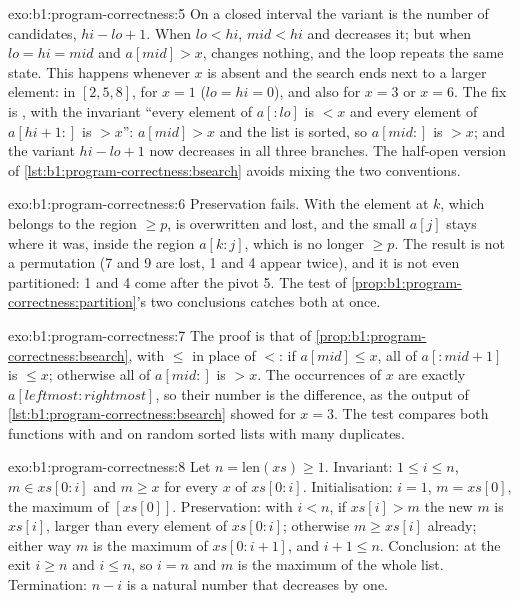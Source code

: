 \begin{solution}{exo:b1:program-correctness:5}
On a closed interval the variant is the number of candidates, $hi - lo + 1$. When $lo < hi$, $mid < hi$ and
 decreases it; but when $lo = hi = mid$ and $a[mid] > x$,  changes nothing, and the loop
repeats the same state. This happens whenever $x$ is absent and the search ends next to a larger element: in
$[2, 5, 8]$, for $x = 1$ ($lo = hi = 0$), and also for $x = 3$ or $x = 6$. The fix is , with the
invariant ``every element of $a[{:}lo]$ is $< x$ and every element of $a[hi + 1{:}]$ is $> x$'': $a[mid] > x$ and the
list is sorted, so $a[mid{:}]$ is $> x$; and the variant $hi - lo + 1$ now decreases in all three branches. The
half-open version of \cref{lst:b1:program-correctness:bsearch} avoids mixing the two conventions.
\end{solution}

\begin{solution}{exo:b1:program-correctness:6}
Preservation fails. With  the element at $k$, which belongs to the region $\geq p$, is overwritten and
lost, and the small $a[j]$ stays where it was, inside the region $a[k{:}j]$, which is no longer $\geq p$. The result is
not a permutation (7 and 9 are lost, 1 and 4 appear twice), and it is not even partitioned: 1 and 4 come after the
pivot 5. The test of \cref{prop:b1:program-correctness:partition}'s two conclusions catches both at once.
\end{solution}

\begin{solution}{exo:b1:program-correctness:7}
The proof is that of \cref{prop:b1:program-correctness:bsearch}, with $\leq$ in place of $<$: if $a[mid] \leq x$, all
of $a[{:}mid + 1]$ is $\leq x$; otherwise all of $a[mid{:}]$ is $> x$. The occurrences of $x$ are exactly
$a[\mathit{leftmost}{:}\mathit{rightmost}]$, so their number is the difference, as the output of
\cref{lst:b1:program-correctness:bsearch} showed for $x = 3$. The test compares both functions with 
and  on random sorted lists with many duplicates.
\end{solution}

\begin{solution}{exo:b1:program-correctness:8}
Let $n = \text{len}(xs) \geq 1$. Invariant: $1 \leq i \leq n$, $m \in xs[0{:}i]$ and $m \geq x$ for every $x$ of
$xs[0{:}i]$. Initialisation: $i = 1$, $m = xs[0]$, the maximum of $[xs[0]]$. Preservation: with $i < n$, if $xs[i] > m$
the new $m$ is $xs[i]$, larger than every element of $xs[0{:}i]$; otherwise $m \geq xs[i]$ already; either way $m$ is
the maximum of $xs[0{:}i + 1]$, and $i + 1 \leq n$. Conclusion: at the exit $i \geq n$ and $i \leq n$, so $i = n$ and
$m$ is the maximum of the whole list. Termination: $n - i$ is a natural number that decreases by one.
\end{solution}

